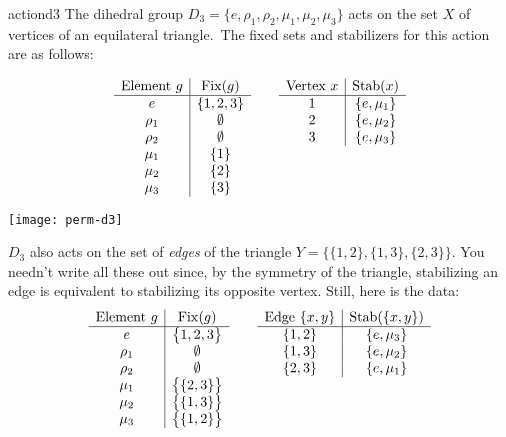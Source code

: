 \begin{example}{}{actiond3}
	The dihedral group $D_3=\{e,\rho_1,\rho_2,\mu_1,\mu_2,\mu_3\}$ acts on the set $X$ of vertices of an equilateral triangle.\footnotemark\ The fixed sets and stabilizers for this action are as follows:\par
	\begin{minipage}[t]{0.74\linewidth}\vspace{-10pt}
		\[
			\begin{array}[t]{c|c}
				\text{Element $g$}&\operatorname{Fix}(g)\\\hline
				e&\{1,2,3\}\\
				\rho_1&\emptyset\\
				\rho_2&\emptyset\\
				\mu_1&\{1\}\\
				\mu_2&\{2\}\\
				\mu_3&\{3\}
			\end{array}
			\qquad
			\begin{array}[t]{c|c}
				\text{Vertex $x$}&\operatorname{Stab}(x)\\\hline
				1&\{e,\mu_1\}\\
				2&\{e,\mu_2\}\\
				3&\{e,\mu_3\}
			\end{array}
		\]
	\end{minipage}
	\hfill
	\begin{minipage}[t]{0.25\linewidth}\vspace{-20pt}
		\flushright\texttt{[image: perm-d3]}
	\end{minipage}\smallbreak
	$D_3$ also acts on the set of \emph{edges} of the triangle $Y=\bigl\{\{1,2\},\{1,3\},\{2,3\}\bigr\}$. You needn't write all these out since, by the symmetry of the triangle, stabilizing an edge is equivalent to stabilizing its opposite vertex. Still, here is the data:
	\[
		\begin{array}[t]{c|c}
			\text{Element $g$}&\operatorname{Fix}(g)\\\hline
			e&\bigl\{1,2,3\bigr\}\\
			\rho_1&\emptyset\\
			\rho_2&\emptyset\\
			\mu_1&\bigl\{\{2,3\}\bigr\}\\
			\mu_2&\bigl\{\{1,3\}\bigr\}\\
			\mu_3&\bigl\{\{1,2\}\bigr\}
		\end{array}
		\qquad
		\begin{array}[t]{c|c}
			\text{Edge $\{x,y\}$}&\operatorname{Stab}(\{x,y\})\\\hline
			\{1,2\}&\{e,\mu_3\}\\
			\{1,3\}&\{e,\mu_2\}\\
			\{2,3\}&\{e,\mu_1\}
		\end{array}
	\]
\end{example}

